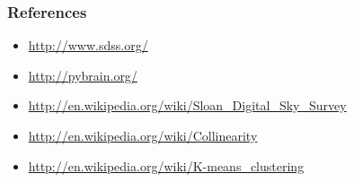 \documentclass{beamer}
\begin{document}
\begin{frame}
    \frametitle{References}
    \small
    \begin{itemize}
        \item \url{http://www.sdss.org/}
        \item \url{http://pybrain.org/}
        \item \url{http://en.wikipedia.org/wiki/Sloan_Digital_Sky_Survey}
        \item \url{http://en.wikipedia.org/wiki/Collinearity}
        \item \url{http://en.wikipedia.org/wiki/K-means_clustering}
    \end{itemize}
\end{frame}
\end{document}
